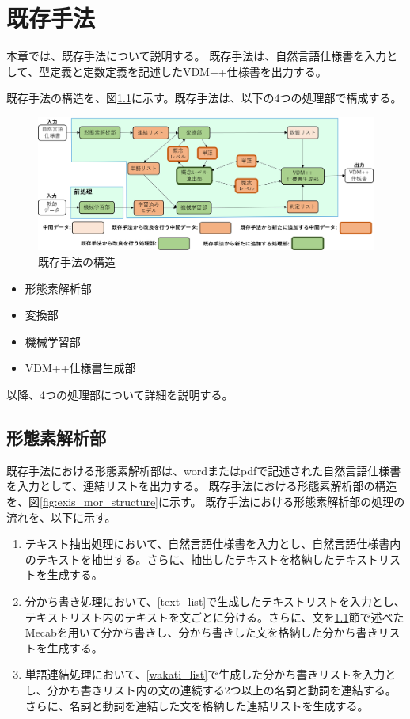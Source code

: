 \chapter{既存手法}\label{cha:Function}

本章では、既存手法について説明する。
既存手法は、自然言語仕様書を入力として、型定義と定数定義を記述したVDM++仕様書を出力する。

既存手法の構造を、図\ref{fig:exis_structure}に示す。既存手法は、以下の4つの処理部で構成する。

\begin{figure}[tp]
    \begin{center}
        \includegraphics[width=1.0\columnwidth]{image/vgml_structure.png}
        \caption{既存手法の構造}
        \label{fig:exis_structure}
    \end{center}
\end{figure}

\begin{itemize}
    \item 形態素解析部
    \item 変換部
    \item 機械学習部
    \item VDM++仕様書生成部
\end{itemize}

以降、4つの処理部について詳細を説明する。

\section{形態素解析部}
既存手法における形態素解析部は、wordまたはpdfで記述された自然言語仕様書を入力として、連結リストを出力する。
既存手法における形態素解析部の構造を、図\ref{fig:exis_mor_structure}に示す。
既存手法における形態素解析部の処理の流れを、以下に示す。

\begin{enumerate}
    \item テキスト抽出処理において、自然言語仕様書を入力とし、自然言語仕様書内のテキストを抽出する。さらに、抽出したテキストを格納したテキストリストを生成する。
    \label{text_list}
    \item 分かち書き処理において、\ref{text_list}で生成したテキストリストを入力とし、テキストリスト内のテキストを文ごとに分ける。さらに、文を\ref{}節で述べたMecabを用いて分かち書きし、分かち書きした文を格納した分かち書きリストを生成する。
    \label{wakati_list}
    \item 単語連結処理において、\ref{wakati_list}で生成した分かち書きリストを入力とし、分かち書きリスト内の文の連続する2つ以上の名詞と動詞を連結する。さらに、名詞と動詞を連結した文を格納した連結リストを生成する。
\end{enumerate}

